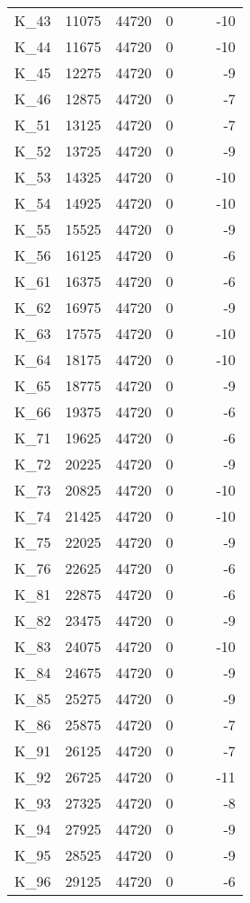 \begin{tabular}{lrrrllr}
K\_43 & 11075 & 44720 & 0 &  &  & -10 \\
K\_44 & 11675 & 44720 & 0 &  &  & -10 \\
K\_45 & 12275 & 44720 & 0 &  &  & -9 \\
K\_46 & 12875 & 44720 & 0 &  &  & -7 \\
K\_51 & 13125 & 44720 & 0 &  &  & -7 \\
K\_52 & 13725 & 44720 & 0 &  &  & -9 \\
K\_53 & 14325 & 44720 & 0 &  &  & -10 \\
K\_54 & 14925 & 44720 & 0 &  &  & -10 \\
K\_55 & 15525 & 44720 & 0 &  &  & -9 \\
K\_56 & 16125 & 44720 & 0 &  &  & -6 \\
K\_61 & 16375 & 44720 & 0 &  &  & -6 \\
K\_62 & 16975 & 44720 & 0 &  &  & -9 \\
K\_63 & 17575 & 44720 & 0 &  &  & -10 \\
K\_64 & 18175 & 44720 & 0 &  &  & -10 \\
K\_65 & 18775 & 44720 & 0 &  &  & -9 \\
K\_66 & 19375 & 44720 & 0 &  &  & -6 \\
K\_71 & 19625 & 44720 & 0 &  &  & -6 \\
K\_72 & 20225 & 44720 & 0 &  &  & -9 \\
K\_73 & 20825 & 44720 & 0 &  &  & -10 \\
K\_74 & 21425 & 44720 & 0 &  &  & -10 \\
K\_75 & 22025 & 44720 & 0 &  &  & -9 \\
K\_76 & 22625 & 44720 & 0 &  &  & -6 \\
K\_81 & 22875 & 44720 & 0 &  &  & -6 \\
K\_82 & 23475 & 44720 & 0 &  &  & -9 \\
K\_83 & 24075 & 44720 & 0 &  &  & -10 \\
K\_84 & 24675 & 44720 & 0 &  &  & -9 \\
K\_85 & 25275 & 44720 & 0 &  &  & -9 \\
K\_86 & 25875 & 44720 & 0 &  &  & -7 \\
K\_91 & 26125 & 44720 & 0 &  &  & -7 \\
K\_92 & 26725 & 44720 & 0 &  &  & -11 \\
K\_93 & 27325 & 44720 & 0 &  &  & -8 \\
K\_94 & 27925 & 44720 & 0 &  &  & -9 \\
K\_95 & 28525 & 44720 & 0 &  &  & -9 \\
K\_96 & 29125 & 44720 & 0 &  &  & -6 \\
\bottomrule
\end{tabular}
